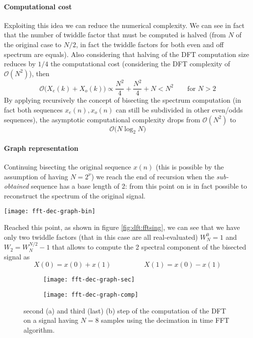 		\paragraph{Computational cost} Exploiting this idea we can reduce the numerical complexity. We can see in fact that the number of twiddle factor that must be computed is halved (from $N$ of the original case to $N/2$, in fact the twiddle factors for both even and off spectrum are equals). Also considering that halving of the DFT computation size reduces by $1/4$ the computational cost (considering the DFT complexity of $\mathcal O(N^2)$), then
		\[ \mathcal O\Big( X_e(k) + X_o(k) \Big) \propto \frac{N^2}{4} + \frac{N^2}{4} + N < N^2 \qquad \textrm{for } N > 2  \]
		By applying recursively the concept of bisecting the spectrum computation (in fact both sequences $x_e(n),x_o(n)$ can still be subdivided in other even/odds sequences), the asymptotic computational complexity drops from $\mathcal O(N^2)$ to
		\[ \mathcal O\big(N\log_2N\big) \]
		
		\paragraph{Graph representation} Continuing bisecting the original sequence $x(n)$ (this is possible by the assumption of having $N=2^\nu$) we reach the end of recursion when the \textit{sub-obtained} sequence has a base length of 2: from this point on is in fact possible to reconstruct the spectrum of the original signal.	
		
		\begin{SCfigure}[2][bht]
			\centering \texttt{[image: fft-dec-graph-bin]}
			\caption{graph representation of the \fft using the decimation in time algorithm computed on 2 points starting from a signal of length $N=8$.} \label{fig:dft:fftsing}
		\end{SCfigure}
		
		Reached this point, as shown in figure \ref{fig:dft:fftsing}, we can see that we have only two twiddle factors (that in this case are all real-evaluated) $W_N^0 = 1$ and $W_2 = W_N^{N/2} - 1$ that allows to compute the 2 spectral component of the bisected signal as
		\[ X(0) = x(0) + x(1) \hspace{2cm} X(1) = x(0)- x(1) \]
		
		\begin{figure}[b!t]
			\centering
			\begin{subfigure}{0.48\linewidth}
				\centering \texttt{[image: fft-dec-graph-sec]} \caption{}
			\end{subfigure}
			\begin{subfigure}{0.48\linewidth}
				\centering \texttt{[image: fft-dec-graph-comp]} \caption{}
			\end{subfigure}
			\caption{second (a) and third (last) (b) step of the computation of the DFT on a signal having $N=8$ samples using the decimation in time FFT algorithm.} \label{fig:dft:fftcomp}
		\end{figure}
		
